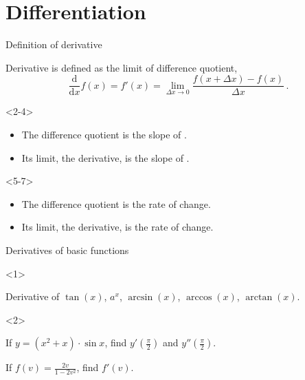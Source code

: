 \section{Differentiation}
\begin{frame}{Definition of derivative}


Derivative is defined as the limit of difference quotient,
\[
\frac{\mathrm{d}}{\mathrm{d}x}f\left(x\right)=f'\left(x\right)=\lim_{\Delta x\to0}\frac{f\left(x+\Delta x\right)-f\left(x\right)}{\Delta x}\,.
\]

\begin{onlyenv}<2-4>

\begin{itemize}
\item The difference quotient is the slope of .
\item Its limit, the derivative, is the slope of .
\end{itemize}
\end{onlyenv}



\begin{onlyenv}<5-7>

\begin{itemize}
\item The difference quotient is the  rate of change.
\item Its limit, the derivative, is the  rate
of change.
\end{itemize}
\end{onlyenv}

\end{frame}

\begin{frame}{Derivatives of basic functions}

\begin{onlyenv}<1>


Derivative of $\tan(x)$, $a^{x}$, $\arcsin(x)$, $\arccos(x)$,
$\arctan(x)$.

\end{onlyenv}



\begin{onlyenv}<2>

\begin{example}
If $y=\left(x^{2}+x\right)\cdot\sin x$, find $y'\left(\frac{\pi}{2}\right)$
and $y''\left(\frac{\pi}{2}\right)$.
\end{example}



\begin{example}
If $f\left(v\right)=\frac{2v}{1-2v^{2}}$, find $f'\left(v\right)$.
\end{example}

\end{onlyenv}

\end{frame}

